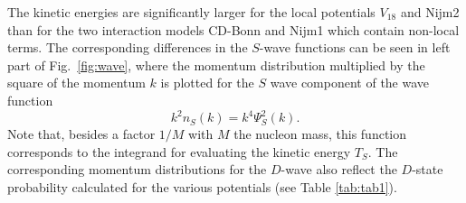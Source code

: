 The kinetic energies are significantly larger for the local potentials
$V_{18}$ and Nijm2 than for the two interaction models CD-Bonn and Nijm1
which contain non-local terms. 
The corresponding differences in the $S$-wave functions 
can be seen in left part of
Fig.\ \ref{fig:wave}, 
where 
the momentum distribution multiplied by the square of the momentum $k$ is
plotted for the $S$ wave component of the wave function
\begin{equation}
     k^2 n_S (k) = k^4 \Psi_S^2 (k).
\label{eq:mom}
\end{equation}
Note that, besides a factor $1/M$ with $M$ the nucleon mass, this function 
corresponds to the integrand for evaluating the kinetic energy $T_S$. The 
corresponding momentum distributions for the $D$-wave also reflect the 
$D$-state probability calculated for the various potentials (see Table
\ref{tab:tab1}).

